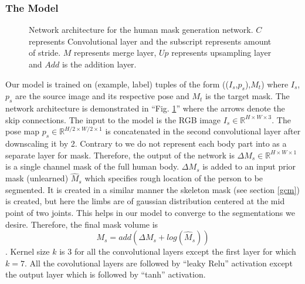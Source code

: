 \documentclass[conference]{IEEEtran}
\begin{document}
\subsubsection{The Model}
\begin{figure}[htbp]
\caption{Network architecture for the human mask generation network. $C$ represents Convolutional layer and the subscript represents amount of stride. $M$ represents merge layer, $Up$ represents upsampling layer and $Add$ is the addition layer. }
\label{fig:net}
\end{figure}
Our model is trained on (example, label) tuples of the form (($I_{s}$,$p_{s}$),$M_{t}$) where $I_{s}$, $p_{s}$ are the source image and its respective pose and $M_{t}$ is the target mask. The network architecture is demonstrated in ``Fig. \ref{fig:net}'' where the arrows denote the skip connections. The input to the model is the RGB image $I_{s} \in \mathbb{R}^{H\times W \times 3}$. The pose map $p_{s} \in \mathbb{R}^{H/2\times W/2\times 1}$ is concatenated in the second convolutional layer after downscaling it by 2. Contrary to \cite{pw} we do not represent each body part into as a separate layer for mask. Therefore, the output of the network is $\Delta M_{s} \in \mathbb{R}^{H\times W\times 1}$ is a single channel mask of the full human body. $\Delta M_{s}$ is added to an input prior mask (unlearned) $\hat M_{s}$ which specifies rough location of the person to be segmented. It is created in a similar manner the skeleton mask (see section \ref{gcm}) is created, but here the limbs are of gaussian distribution centered at the mid point of two joints. This helps in our model to converge to the segmentations we desire. Therefore, the final mask volume is \begin{equation} M_{s} = add (\Delta M_{s} + log(\hat M_{s})) \end{equation}. Kernel size $k$ is $3$ for all the convolutional layers except the first layer for which $k=7$. All the covolutional layers are followed by ``leaky Relu'' activation except the output layer which is followed by ``tanh'' activation.  
\end{document}
